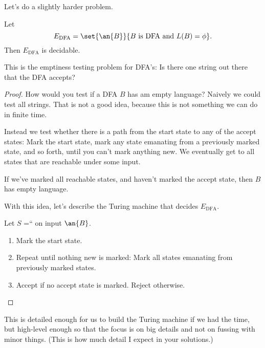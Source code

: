 Let's do a slightly harder problem.
\begin{thm}
Let 
\[E_{\text{DFA}}=\set{\an{B}}{B\text{ is DFA and }L(B)=\phi}.
\]
Then $E_{\text{DFA}}$ is decidable.
\end{thm}
This is the emptiness testing problem for DFA's: Is there one string out there that the DFA accepts?
\begin{proof}
How would you test if a DFA $B$ has am empty language?
Naively we could test all strings. That is not a good idea, because this is not something we can do in finite time.


Instead we test whether there is a path from the start state to any of the accept states: Mark the start state, mark any state emanating from a previously marked state, and so forth, until you can't mark anything new. We eventually get to all states that are reachable under some input.

If we've marked all reachable states, and haven't marked the accept state, then $B$ has empty language.


With this idea, let's describe the Turing machine that decides $E_{\text{DFA}}$.

Let $S$ =`` on input $\an{B}$.
\begin{enumerate}
\item
Mark the start state.
\item
Repeat until nothing new is marked: Mark all states emanating from previously marked states.
\item
Accept if no accept state is marked. Reject otherwise.
\end{enumerate}
\end{proof}
This is detailed enough for us to build the Turing machine if we had the time, but high-level enough so that the focus is on big details and not on fussing with minor things. (This is how much detail I expect in your solutions.)

